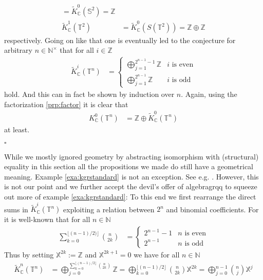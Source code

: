 \begin{exa}
\begin{enumerate}
\begin{align*}
  =
  \tilde{K}_{\mathbb{C}}^{0}(\mathbb{S}^{2})
  =
  \mathbb{Z}
  \\
  \tilde{K}_{\mathbb{C}}^{1}(\mathbb{T}^{2})
  &=
  \tilde{K}_{\mathbb{C}}^{0}(S(\mathbb{T}^{2}))
  =
  \mathbb{Z} \oplus \mathbb{Z}
\end{align*}
respectively. Going on like that one is eventually led to the conjecture for arbitrary $n \in \mathbb{N}^{\times}$ that for all $i \in \mathbb{Z}$
\begin{align*}
  \tilde{K}_{\mathbb{C}}^{i}(\mathbb{T}^{n})
  &=
  \begin{cases}
    \bigoplus_{j=1}^{2^{n-1}-1}
    \mathbb{Z}
    &
    \text{$i$ is even}
    \\
    \bigoplus_{j=1}^{2^{n-1}}
    \mathbb{Z}
    &
    \text{$i$ is odd}
  \end{cases}
\end{align*}
hold. And this can in fact be shown by induction over $n$. Again, using the factorization \ref{prp:factor} it is clear that
\begin{align*}
  K_{\mathbb{C}}^{0}(\mathbb{T}^{n})
  &=
  \mathbb{Z}
  \oplus
  \tilde{K}_{\mathbb{C}}^{0}(\mathbb{T}^{n})
\end{align*}
at least.
\end{enumerate}
\phantom{proven}
\hfill
$\square$
\end{exa}
While we mostly ignored geometry by abstracting isomorphism with (structural) equality in this section all the propositions we made do still have a geometrical meaning. Example \ref{exa:kgrstandard} is not an exception. See e.g. \cite{c7f15065}. However, this is not our point and we further accept {\glqq}the devil's offer of algebra{grqq} to squeeze out more of example \ref{exa:kgrstandard}: To this end we first rearrange the direct sums in $\tilde{K}_{\mathbb{C}}^{i}(\mathbb{T}^{n})$ exploiting a relation between $2^{n}$ and binomial coefficients. For it is well-known that for all $n \in \mathbb{N}$
\begin{align*}
  \sum_{k=0}^{\lfloor (n - 1)/2) \rfloor}\binom{n}{2k}
  &=
  \begin{cases}
    2^{n-1} - 1
    &
    \text{$n$ is even}
    \\
    2^{n-1}
    &
    \text{$n$ is odd}
  \end{cases}
\end{align*}
Thus by setting $\mathbb{X}^{2k} := \mathbb{Z}$ and $\mathbb{X}^{2k+1} = 0$ we have for all $n \in \mathbb{N}$
\begin{align*}
  \tilde{K}_{\mathbb{C}}^{n}(\mathbb{T}^{n})
  &=
  \bigoplus_{j=0}^{\sum_{k=0}^{\lfloor (n - 1)/2 \rfloor}\binom{n}{2k}}
  \mathbb{Z}
  =
  \bigoplus_{k=0}^{\lfloor (n - 1)/2 \rfloor}
  \binom{n}{2k}
  \mathbb{X}^{2k}
  =
  \bigoplus_{j=0}^{n-1}
  \binom{n}{j}
  \mathbb{X}^{j}
\end{align*}
